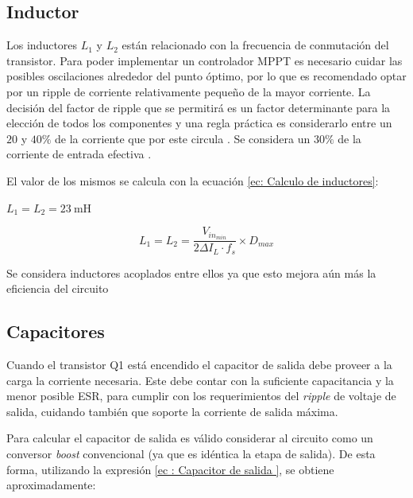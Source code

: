         
  
        \subsection{Inductor}
        
            Los inductores $L_1$ y $L_2$ están relacionado con la frecuencia de conmutación del transistor. Para poder implementar un controlador MPPT es necesario cuidar las posibles oscilaciones alrededor del punto óptimo, por lo que es recomendado optar por un ripple de corriente relativamente pequeño \cite{atia2009photovoltaic}de la mayor corriente. La decisión del factor de ripple que se permitirá es un factor determinante para la elección de todos los componentes y una regla práctica es considerarlo entre un $20$ y $40\% $ de la corriente que por este circula \cite{falin2008designing}. Se considera un $30\%$ de la corriente de entrada efectiva \cite{kaouane2015design}. 
            
            El valor de los mismos se calcula con la ecuación \ref{ec: Calculo de inductores}: 
            
            $L_1 = L_2 =23~\mathrm{mH}$
            
            \begin{equation}
                L_1 = L_2 = \frac{V_{in_{min}}}{2\Delta I_L \cdot f_s} \times D_{max} 
                \label{ec: Calculo de inductores}
            \end{equation}
            
            Se considera inductores acoplados entre ellos ya que esto mejora aún más la eficiencia del circuito \cite{rios2017sistema}
    
        \subsection{Capacitores}
            
            Cuando el transistor Q1 está encendido el capacitor de salida debe proveer a la carga la corriente necesaria. Este debe contar con la suficiente capacitancia y la menor posible ESR, para cumplir con los requerimientos del \textit{ripple} de voltaje de salida, cuidando también que soporte la corriente de salida máxima. 
            
            Para calcular el capacitor de salida es válido considerar al circuito como un conversor \textit{boost} convencional (ya que es idéntica la etapa de salida). De esta forma, utilizando la expresión \ref{ec : Capacitor de salida }\cite{falin2008designing}, se obtiene aproximadamente: 
            
